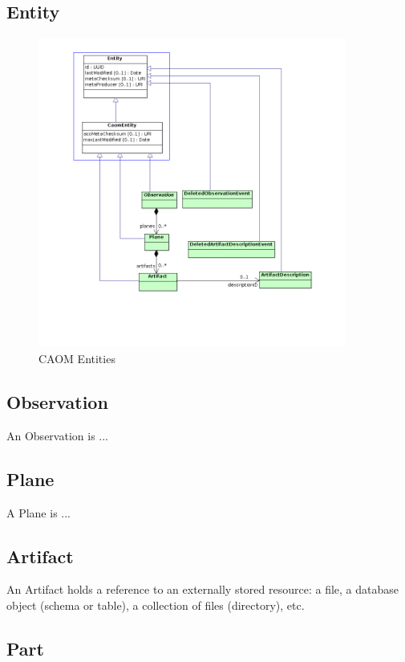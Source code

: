 \documentclass[11pt,a4paper]{ivoa}
\begin{document}
\subsection{Entity}

\begin{figure}
\centering
\includegraphics[width=0.9\textwidth]{src/uml/CAOM4entities.png}
\caption{CAOM Entities}
\label{fig:entity}
\end{figure}

\subsection{Observation}

An Observation is ...

\subsection{Plane}

A Plane is ...

\subsection{Artifact}

An Artifact holds a reference to an externally stored resource: a file, a
database object (schema or table), a collection of files (directory), etc.

\subsection{Part}
\end{document}
